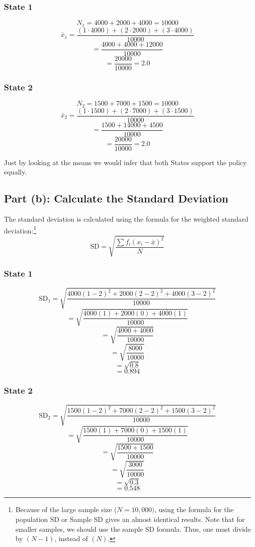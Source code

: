 \documentclass{article}
\begin{document}
\subsubsection*{State 1}
\[
N_1 = 4000 + 2000 + 4000 = 10000
\]
\[
\bar{x}_1 = \frac{(1 \cdot 4000) + (2 \cdot 2000) + (3 \cdot 4000)}{10000}
\]
\[
= \frac{4000 + 4000 + 12000}{10000}
\]
\[
= \frac{20000}{10000} = 2.0
\]

\subsubsection*{State 2}
\[
N_2 = 1500 + 7000 + 1500 = 10000
\]
\[
\bar{x}_2 = \frac{(1 \cdot 1500) + (2 \cdot 7000) + (3 \cdot 1500)}{10000}
\]
\[
= \frac{1500 + 14000 + 4500}{10000}
\]
\[
= \frac{20000}{10000} = 2.0
\]

Just by looking at the means we would infer that both States support the policy equally.

\subsection*{Part (b): Calculate the Standard Deviation}
The standard deviation is calculated using the formula for the weighted standard deviation:\footnote{Because of the large sample size ($N=10,000)$, using the formula for the population SD or Sample SD gives an almost identical results. Note that for smaller samples, we should use the sample SD formula. Thus, one must divide by $(N-1)$, instead of $(N)$.}
\[
\text{SD} = \sqrt{\frac{\sum f_i (x_i - \bar{x})^2}{N}}
\]

\subsubsection*{State 1}
\[
\text{SD}_1 = \sqrt{\frac{4000 (1 - 2)^2 + 2000 (2 - 2)^2 + 4000 (3 - 2)^2}{10000}}
\]
\[
= \sqrt{\frac{4000 (1) + 2000 (0) + 4000 (1)}{10000}}
\]
\[
= \sqrt{\frac{4000 + 4000}{10000}}
\]
\[
= \sqrt{\frac{8000}{10000}}
\]
\[
= \sqrt{0.8}
\]
\[
= 0.894
\]

\subsubsection*{State 2}
\[
\text{SD}_2 = \sqrt{\frac{1500 (1 - 2)^2 + 7000 (2 - 2)^2 + 1500 (3 - 2)^2}{10000}}
\]
\[
= \sqrt{\frac{1500 (1) + 7000 (0) + 1500 (1)}{10000}}
\]
\[
= \sqrt{\frac{1500 + 1500}{10000}}
\]
\[
= \sqrt{\frac{3000}{10000}}
\]
\[
= \sqrt{0.3}
\]
\[
= 0.548
\]
\end{document}
